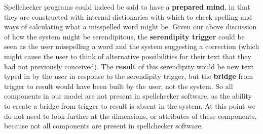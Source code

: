 Spellchecker programs could indeed be said to have a \textbf{prepared mind}, in that they are constructed with internal dictionaries with which to check spelling and ways of calculating what a misspelled word might be. Given our above discussion of how the system might be serendipitous, the \textbf{serendipity trigger} could be seen as the user misspelling a word and the system suggesting a correction (which might cause the user to think of alternative possibilities for their text that they had not previously conceived). The \textbf{result} of this serendipity would be new text typed in by the user in response to the serendipity trigger, but the \textbf{bridge} from trigger to result would have been built by the user, not the system. So all components in our model are not present in spellchecker software, as the ability to create a bridge from trigger to result is absent in the system. At this point we do not need to look further at the dimensions, or attributes of these components, because not all components are present in spellchecker software. 

